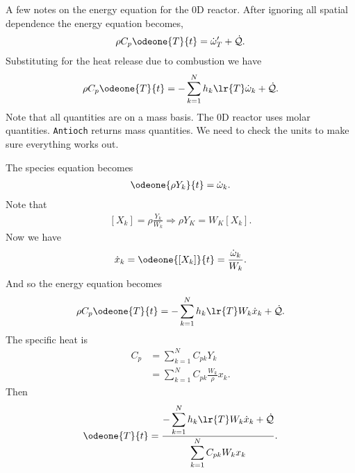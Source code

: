 


A few notes on the energy equation for the 0D reactor.  After ignoring all spatial
dependence the energy equation becomes,
\begin{align}
  \rho C_{p}\odeone{T}{t} = \dot{\omega}_{T}^{\prime} + \dot{\mathcal{Q}}.
\end{align}
Substituting for the heat release due to combustion we have
\begin{align}
  \rho C_{p}\odeone{T}{t} = -\sum_{k=1}^{N}h_{k}\lr{T}\dot{\omega}_{k} + \dot{\mathcal{Q}}.
\end{align}
Note that all quantities are on a mass basis.  The 0D reactor uses molar quantities.
\texttt{Antioch} returns mass quantities.  We need to check the units to make sure 
everything works out.

The species equation becomes
\begin{align}
  \odeone{\rho Y_{k}}{t} = \dot{\omega}_{k}.
\end{align}
Note that
\begin{align}
  \left[X_{k}\right] = \rho \frac{Y_{k}}{W_{k}} \Rightarrow \rho Y_{K} = W_{K}\left[X_{k}\right].
\end{align}
Now we have
\begin{align}
  \dot{x}_{k} = \odeone{\left[X_{k}\right]}{t} = \frac{\dot{\omega}_{k}}{W_{k}}.
\end{align}
And so the energy equation becomes
\begin{align}
  \rho C_{p}\odeone{T}{t} = - \sum_{k=1}^{N}h_{k}\lr{T}W_{k}\dot{x}_{k} + \dot{\mathcal{Q}}.
\end{align}
The specific heat is
\begin{align}
  C_{p} &= \sum_{k=1}^{N}C_{pk}Y_{k} \\
        &= \sum_{k=1}^{N}C_{pk}\frac{W_{k}}{\rho}x_{k}.
\end{align}
Then
\begin{align}
  \odeone{T}{t} = \frac{\displaystyle -\sum_{k=1}^{N}h_{k}\lr{T}W_{k}\dot{x}_{k} + \dot{\mathcal{Q}}}{\displaystyle \sum_{k=1}^{N}C_{pk}W_{k}x_{k}}.
\end{align}
